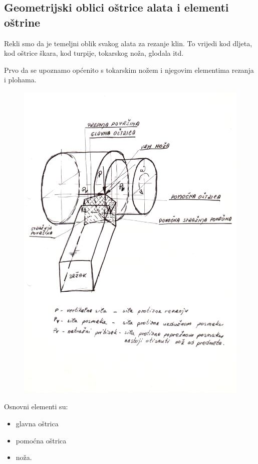 \documentclass[a4paper,12pt]{article}
\numberwithin{figure}{section}
\begin{document}
\subsection{Geometrijski oblici oštrice alata i elementi oštrine}
Rekli smo da je temeljni oblik svakog alata za rezanje klin. To vrijedi kod dljeta, kod oštrice škara, kod turpije, tokarskog noža, glodala itd. \par
Prvo da se upoznamo općenito s tokarskim nožem i njegovim elementima rezanja i plohama.
\begin{figure}[!h]
\centering
\includegraphics[width=\textwidth]{image_01.png}
\end{figure}
\FloatBarrier
\noindent Osnovni elementi su:
\begin{itemize}
\item glavna oštrica
\item pomoćna oštrica
\item noža.
\end{itemize}
\end{document}
